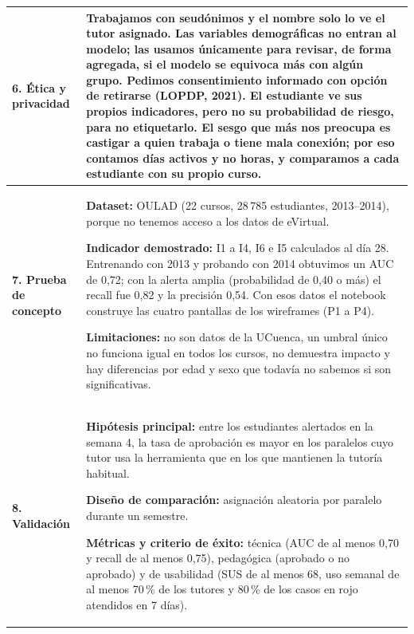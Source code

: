 \documentclass[10pt]{article}
\begin{document}
{\begin{longtable}{P{3.3cm} P{22.3cm}}
\textbf{6. Ética y privacidad}
& Trabajamos con seudónimos y el nombre solo lo ve el tutor asignado. Las variables demográficas no entran al modelo; las usamos únicamente para revisar, de forma agregada, si el modelo se equivoca más con algún grupo. Pedimos consentimiento informado con opción de retirarse (LOPDP, 2021). El estudiante ve sus propios indicadores, pero no su probabilidad de riesgo, para no etiquetarlo. El sesgo que más nos preocupa es castigar a quien trabaja o tiene mala conexión; por eso contamos días activos y no horas, y comparamos a cada estudiante con su propio curso.\\
\midrule

\textbf{7. Prueba de concepto}
& \textbf{Dataset:} OULAD (22 cursos, 28\,785 estudiantes, 2013--2014), porque no tenemos acceso a los datos de eVirtual.\par
\textbf{Indicador demostrado:} I1 a I4, I6 e I5 calculados al día 28. Entrenando con 2013 y probando con 2014 obtuvimos un AUC de 0,72; con la alerta amplia (probabilidad de 0,40 o más) el recall fue 0,82 y la precisión 0,54. Con esos datos el notebook construye las cuatro pantallas de los wireframes (P1 a P4).\par
\textbf{Limitaciones:} no son datos de la UCuenca, un umbral único no funciona igual en todos los cursos, no demuestra impacto y hay diferencias por edad y sexo que todavía no sabemos si son significativas.\\
\midrule

\textbf{8. Validación}
& \textbf{Hipótesis principal:} entre los estudiantes alertados en la semana 4, la tasa de aprobación es mayor en los paralelos cuyo tutor usa la herramienta que en los que mantienen la tutoría habitual.\par
\textbf{Diseño de comparación:} asignación aleatoria por paralelo durante un semestre.\par
\textbf{Métricas y criterio de éxito:} técnica (AUC de al menos 0,70 y recall de al menos 0,75), pedagógica (aprobado o no aprobado) y de usabilidad (SUS de al menos 68, uso semanal de al menos 70\,\% de los tutores y 80\,\% de los casos en rojo atendidos en 7 días).\\
\midrule


\end{longtable}}
\end{document}
